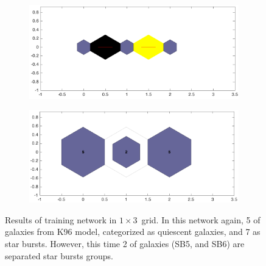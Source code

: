             \begin{figure}
                \begin{subfigure}[b]{0.5\textwidth}
                    \centering
                    \includegraphics[width=\textwidth]{../images/1d/dist_1_by_3.png}
                \end{subfigure}
                \hfill
                \begin{subfigure}[b]{0.5\textwidth}
                     \includegraphics[width=\textwidth]{../images/1d/hit_t_1_by_3.png}
                \end{subfigure}
                \caption{Results of training network in $1\times3$~grid. In this network again, 5 of galaxies from K96 model, categorized as quiescent galaxies, and 7 as star bursts. However, this time 2 of galaxies (SB5, and SB6) are separated star bursts groups.}
                 \label{fig: 1by3T}
            \end{figure}
           
